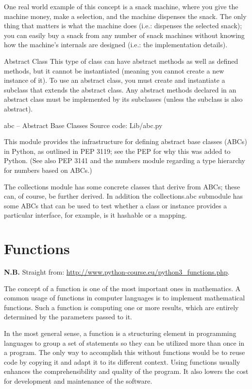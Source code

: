 \documentclass[11pt,a4paper]{article}
\begin{document}
One real world example of this concept is a snack machine, where you
give the machine money, make a selection, and the machine dispenses
the snack. The only thing that matters is what the machine does (i.e.:
dispenses the selected snack); you can easily buy a snack from any
number of snack machines without knowing how the machine's internals
are designed (i.e.: the implementation details).

Abstract Class This type of class can have abstract methods as well as
defined methods, but it cannot be instantiated (meaning you cannot
create a new instance of it). To use an abstract class, you must
create and instantiate a subclass that extends the abstract class. Any
abstract methods declared in an abstract class must be implemented by
its subclasses (unless the subclass is also abstract).

 abc -- Abstract Base Classes
Source code: Lib/abc.py

This module provides the infrastructure for defining abstract base classes (ABCs) in Python, as outlined in PEP 3119; see the PEP for why this was added to Python. (See also PEP 3141 and the numbers module regarding a type hierarchy for numbers based on ABCs.)

The collections module has some concrete classes that derive from ABCs; these can, of course, be further derived. In addition the collections.abc submodule has some ABCs that can be used to test whether a class or instance provides a particular interface, for example, is it hashable or a mapping.




\newpage
\section{Functions}
{\bf N.B.} Straight from: \href{http://www.python-course.eu/python3\_functions.php}{http://www.python-course.eu/python3\_functions.php}. 

The concept of a function is one of the most important ones in
mathematics. A common usage of functions in computer languages is to
implement mathematical functions. Such a function is computing one or
more results, which are entirely determined by the parameters passed
to it.

In the most general sense, a function is a structuring element in
programming languages to group a set of statements so they can be
utilized more than once in a program. The only way to accomplish this
without functions would be to reuse code by copying it and adapt it to
its different context. Using functions usually enhances the
comprehensibility and quality of the program. It also lowers the cost
for development and maintenance of the software.
\end{document}

